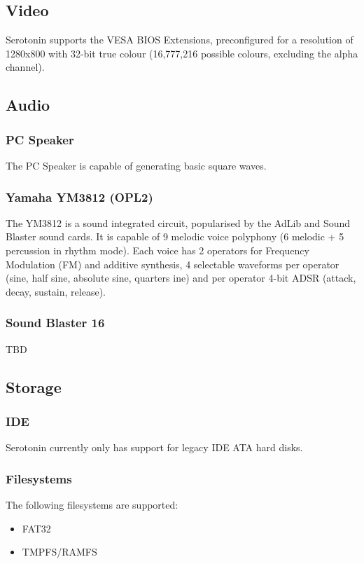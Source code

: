 \documentclass[11pt,a4paper]{article}
\begin{document}
	\subsection{Video}
	Serotonin supports the VESA BIOS Extensions, preconfigured for a resolution of 1280x800 with 32-bit true colour (16,777,216 possible colours, excluding the alpha channel).

	\subsection{Audio}

	\subsubsection{PC Speaker}
	The PC Speaker is capable of generating basic square waves.

	\subsubsection{Yamaha YM3812 (OPL2)}
	The YM3812 is a sound integrated circuit, popularised by the AdLib and Sound Blaster sound cards. It is capable of 9 melodic voice polyphony (6 melodic + 5 percussion in rhythm mode). Each voice has 2 operators for Frequency Modulation (FM) and additive synthesis, 4 selectable waveforms per operator (sine, half sine, absolute sine, quarters ine) and per operator 4-bit ADSR (attack, decay, sustain, release).

	\subsubsection{Sound Blaster 16}
	TBD

	\subsection{Storage}

	\subsubsection{IDE}
	Serotonin currently only has support for legacy IDE ATA hard disks.

	\subsubsection{Filesystems}
	The following filesystems are supported:
		\begin{itemize}
		\item FAT32
		\item TMPFS/RAMFS
	\end{itemize}
\end{document}
